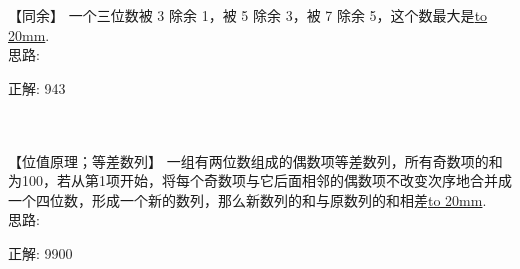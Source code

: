 \item {
    【同余】
    一个三位数被 3 除余 1，被 5 除余 3，被 7 除余 5，这个数最大是\underline{\hbox to 20mm{}}.
    \ifshowSolution
        \fangsong{}
        \\
        思路:

        正解: 943
    \else
        \\ \\ \\
    \fi
}

\item {
    【位值原理；等差数列】
    一组有两位数组成的偶数项等差数列，所有奇数项的和为100，若从第1项开始，将每个奇数项与它后面相邻的偶数项不改变次序地合并成一个四位数，形成一个新的数列，那么新数列的和与原数列的和相差\underline{\hbox to 20mm{}}.
    \ifshowSolution
        \fangsong{}
        \\
        思路:

        正解: 9900
    \else
        \\ \\ \\
    \fi
}
